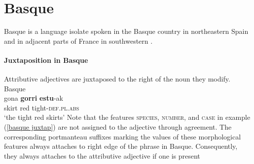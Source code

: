 \section{Basque}
Basque is a language isolate spoken in the Basque country in northeastern Spain and in adjacent parts of France in southwestern . 

\paragraph*{Juxtaposition in Basque}
Attributive adjectives are juxtaposed to the right of the noun they modify.
\ea
\label{basque juxtap}
\rm{Basque \citep[81]{saltarelli1988}}\\
\gll	gona \textbf{gorri} \textbf{estu}-ak\\
	skirt red tight-\textsc{def.pl.abs}\\
\glt	‘the tight red skirts’
\z
Note that the features \textsc{species}, \textsc{number}, and \textsc{case} in example (\ref{basque juxtap}) are not assigned to the adjective through agreement. The corresponding portmanteau suffixes marking the values of these morphological features always attaches to right edge of the phrase in Basque. Consequently, they always attaches to the attributive adjective if one is present \cite[171]{hualde-etal2003}
